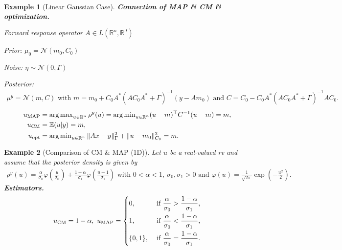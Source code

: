 \documentclass[oneside]{article}
\numberwithin{equation}{section}
\newtheorem{example}{Example}[section]
\begin{document}
\begin{example}[Linear Gaussian Case]
    \textbf{Connection of MAP \& CM \& optimization.}
    
    Forward response operator $A\in L(\mathbb{R}^n,\mathbb{R}^J)$
    
    Prior: $\mu_0 = \mathcal{N}(m_0,C_0)$
    
    Noise: $\eta\sim\mathcal{N}(0,\Gamma)$
    
    Posterior:
    \begin{align*}
        \mu^y = \mathcal{N}(m,C) \mbox{ with } m = m_0 + C_0A^*(AC_0A^* + \Gamma)^{-1}(y - Am_0) \mbox{ and } C = C_0 - C_0A^*(AC_0A^* + \Gamma)^{-1}AC_0.
    \end{align*}
    \begin{align*}
        u_{\rm MAP} &= \operatorname{arg\max}_{u\in\mathbb{R}^n} \rho^y(u) = \operatorname{arg\min}_{u\in\mathbb{R}^n} (u - m)^\top C^{-1}(u - m) = m,\\
        u_{\rm CM} &= \mathbb{E}(u|y) = m,\\
        u_{\rm opt} &= \operatorname{arg\min}_{u\in\mathbb{R}^n} \|Ax - y\|_\Gamma^2 + \|u - m_0\|_{C_0}^2 = m.
    \end{align*}
\end{example}

\begin{example}[Comparison of CM \& MAP (1D)]
    Let $u$ be a real-valued rv and assume that the posterior density is given by
    \begin{align*}
        \rho^y(u) = \frac{\alpha}{\sigma_0}\varphi\left(\frac{u}{\sigma_0}\right) + \frac{1 - \alpha}{\sigma_1}\varphi\left(\frac{u - 1}{\sigma_1}\right) \mbox{ with } 0 < \alpha < 1,\ \sigma_0,\sigma_1 > 0 \mbox{ and } \varphi(u) = \frac{1}{\sqrt{2\pi}}\exp\left(-\frac{u^2}{2}\right).
    \end{align*}
    \textbf{Estimators.}
    \begin{equation*}
        u_{\rm CM} = 1 - \alpha,\ u_{\rm MAP} = \left\{\begin{split}
            &0, &&\mbox{ if } \frac{\alpha}{\sigma_0} > \frac{1 - \alpha}{\sigma_1},\\
            &1, &&\mbox{ if } \frac{\alpha}{\sigma_0} < \frac{1 - \alpha}{\sigma_1},\\
            &\{0,1\}, &&\mbox{ if } \frac{\alpha}{\sigma_0} = \frac{1 - \alpha}{\sigma_1}.
        \end{split}\right.
    \end{equation*}
\end{example}
\end{document}
